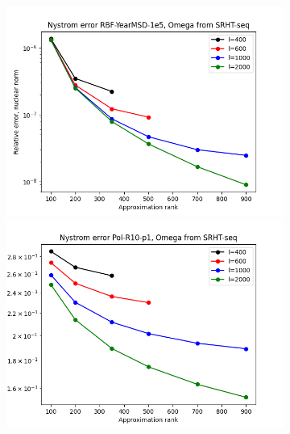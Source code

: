 \documentclass{article}
\theoremstyle{definition}
\begin{document}
\begin{appendices}
\begin{figure}
\begin{subfigure}[t]{\textwidth+20pt\relax}
    \includegraphics[width=\dimexpr\linewidth-20pt\relax]{plots/relerror/relerror_RBF-YearMSD-1e5_SRHT-seq.png}
    \includegraphics[width=\dimexpr\linewidth-20pt\relax]{plots/relerror/relerror_Pol-R10-p1_SRHT-seq.png}

\end{subfigure}
\end{figure}
\end{appendices}
\end{document}
